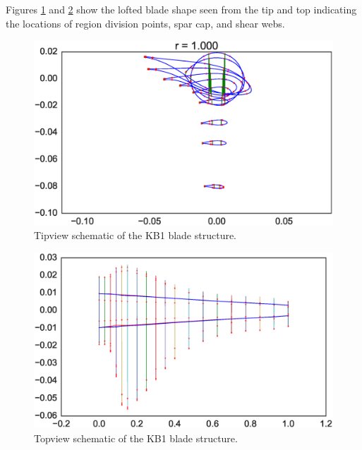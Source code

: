 Figures \ref{fig:tipview} and \ref{fig:topview} show the lofted blade shape seen from the tip and top indicating the locations of region division points, spar cap, and shear webs.

\begin{figure}[pht]
\begin{center}
	\includegraphics[width=.85\linewidth]{figures/KB1_tipview.eps}
\end{center}
\caption{Tipview schematic of the KB1 blade structure.}
\label{fig:tipview}
\end{figure}

\begin{figure}[pht]
\begin{center}
	\includegraphics[width=.85\linewidth]{figures/KB1_topview.eps}
\end{center}
\caption{Topview schematic of the KB1 blade structure.}
\label{fig:topview}
\end{figure}

